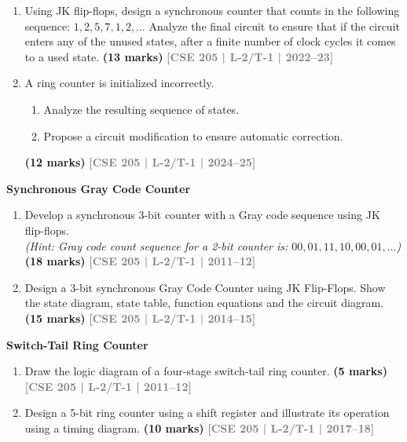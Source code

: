 \documentclass[12pt,a4paper]{article}
\newcommand{\yr}[1]{\hfill\textcolor{gray}{\small\textbf{[#1]}}}
\newcommand{\mk}[1]{\textcolor{orange!70!black}{\small\textbf{(#1 marks)}}}
\newcommand{\subtopic}[2]{%
  \vspace{10pt}
  \noindent\begin{tcolorbox}[colback=#1!8,colframe=#1,boxrule=0.6pt,arc=4pt,
    left=6pt,right=6pt,top=4pt,bottom=4pt]
    \small\bfseries\textcolor{#1}{#2}
  \end{tcolorbox}
  \vspace{2pt}
}
\begin{document}
\begin{enumerate}
\item Using JK flip-flops, design a synchronous counter that counts in the following sequence: $1, 2, 5, 7, 1, 2, \ldots$ Analyze the final circuit to ensure that if the circuit enters any of the unused states, after a finite number of clock cycles it comes to a used state.
\mk{13} \yr{CSE 205 | L-2/T-1 | 2022--23}

\item A ring counter is initialized incorrectly.
\begin{enumerate}
  \item Analyze the resulting sequence of states.
  \item Propose a circuit modification to ensure automatic correction.
\end{enumerate}
\mk{12} \yr{CSE 205 | L-2/T-1 | 2024--25}


\end{enumerate}

\subtopic{cG}{Synchronous Gray Code Counter}
\label{sub:s7-gray}

\begin{enumerate}

\item Develop a synchronous 3-bit counter with a Gray code sequence using JK flip-flops.\\
\textit{(Hint: Gray code count sequence for a 2-bit counter is: $00, 01, 11, 10, 00, 01, \ldots$)}
\mk{18} \yr{CSE 205 | L-2/T-1 | 2011--12}


\item Design a 3-bit synchronous Gray Code Counter using JK Flip-Flops. Show the state diagram, state table, function equations and the circuit diagram.
\mk{15} \yr{CSE 205 | L-2/T-1 | 2014--15}

\end{enumerate}

\subtopic{cG}{Switch-Tail Ring Counter}
\label{sub:s7-ring}

\begin{enumerate}

\item Draw the logic diagram of a four-stage switch-tail ring counter.
\mk{5} \yr{CSE 205 | L-2/T-1 | 2011--12}


\item Design a 5-bit ring counter using a shift register and illustrate its operation using a timing diagram.
\mk{10} \yr{CSE 205 | L-2/T-1 | 2017--18}

\end{enumerate}
\end{document}
